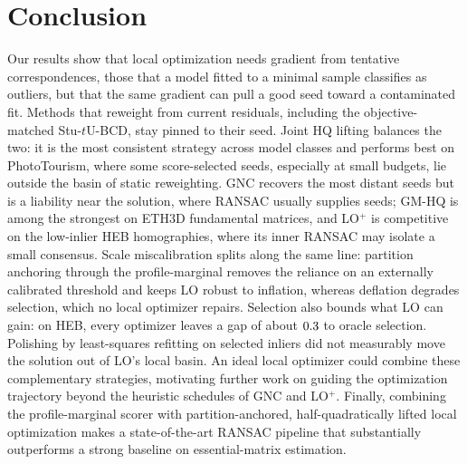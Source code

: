 \documentclass[runningheads]{llncs}
\newcommand{\stuU}{Stu-$t$U}          %
\begin{document}
\begin{table}[t]
	\centering
	\small
	\setlength{\tabcolsep}{4pt}
	\caption{\textbf{RANSAC under scale miscalibration.}
		Scene-averaged median pose error and mAA@$10^\circ$ on the \PTTestScenes{}
		PhotoTourism test scenes; median wall time per pair, single-threaded, on a
		stratified sample of \EtoETimePairs{} pairs per scene (median of
		\EtoETimeRepeats{} repeats); both
		systems tuned at $\zeta=1$, SupeRANSAC at its validated maximum noise level
		with at most $10\,000$ trials. Bold marks the
		better system per column.}
	\label{tab:e2e}
	
\end{table}

\section{Conclusion}
\label{sec:discussion}
Our results show that local optimization needs gradient from tentative
correspondences, those that a model fitted to a minimal sample
classifies as outliers, but that the same gradient can pull a good
seed toward a contaminated fit. Methods that reweight from current
residuals, including the objective-matched \stuU{}-BCD, stay pinned to
their seed. Joint HQ lifting balances the two: it is the most
consistent strategy across model classes and performs best on
PhotoTourism, where some score-selected seeds, especially at small
budgets, lie outside the basin of static reweighting. GNC recovers the
most distant seeds but is a liability near the solution, where RANSAC
usually supplies seeds; GM-HQ is among the strongest on ETH3D
fundamental matrices, and LO$^+$ is competitive on the low-inlier HEB
homographies, where its inner RANSAC may isolate a small
consensus. Scale miscalibration splits along the same line: partition
anchoring through the profile-marginal removes the reliance on an
externally calibrated threshold and keeps LO robust to inflation,
whereas deflation degrades selection, which no local optimizer
repairs. Selection also bounds what LO can gain: on HEB, every
optimizer leaves a gap of about $0.3$ to oracle selection. Polishing
by least-squares refitting on selected inliers did not measurably move
the solution out of LO's local basin. An ideal local optimizer could
combine these complementary strategies, motivating further work on
guiding the optimization trajectory beyond the heuristic schedules of
GNC and LO$^+$. Finally, combining the profile-marginal scorer with
partition-anchored, half-quadratically lifted local optimization makes
a state-of-the-art RANSAC pipeline that substantially outperforms a
strong baseline on essential-matrix estimation.
\end{document}
